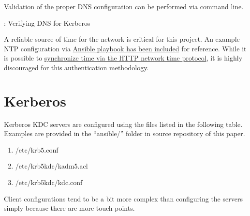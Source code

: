 \justifying
Validation of the proper DNS configuration can be performed via command line. 

\begin{mybox}{\thetcbcounter: Verifying DNS for Kerberos}
	
\end{mybox}


\vspace{2mm}
\vspace{2mm}


\justifying
A reliable source of time for the network is critical for this project. An example NTP configuration via \href{https://github.com/devsecfranklin/paper-kerberos-openldap/blob/main/ansible/roles/common/tasks/ntp.yml}{Ansible playbook has been included} for reference.
While it is possible to \href{http://www.vervest.org/htp/}{synchronize time via the HTTP network time protocol}, it is highly discouraged for this authentication methodology.

\section{\label{sec:krb}Kerberos}

\vspace{2mm}
\vspace{2mm}

\justifying
Kerberos KDC servers are configured using the files listed in the following table. Examples are 
provided in the ``ansible/'' folder in source repository of this paper.

\begin{raggedright}
	\begin{enumerate}
		\item /etc/krb5.conf
		\item /etc/krb5kdc/kadm5.acl
		\item /etc/krb5kdc/kdc.conf
		
	\end{enumerate}
\end{raggedright}

\vspace{2mm}
\vspace{2mm}

Client configurations tend to be a bit more complex than configuring the servers simply because there are more touch points.

\vspace{2mm}
\vspace{2mm}

